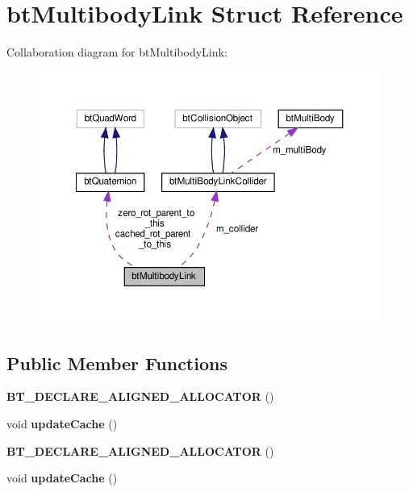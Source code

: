 \hypertarget{structbtMultibodyLink}{}\section{bt\+Multibody\+Link Struct Reference}
\label{structbtMultibodyLink}


Collaboration diagram for bt\+Multibody\+Link\+:
\nopagebreak
\begin{figure}[H]
\begin{center}
\leavevmode
\includegraphics[width=350pt]{structbtMultibodyLink__coll__graph}
\end{center}
\end{figure}
\subsection*{Public Member Functions}
\begin{DoxyCompactItemize}
\item 
\mbox{\label{structbtMultibodyLink_a7f9205c013f7aa0b98caa593c633f013}} 
{\bfseries B\+T\+\_\+\+D\+E\+C\+L\+A\+R\+E\+\_\+\+A\+L\+I\+G\+N\+E\+D\+\_\+\+A\+L\+L\+O\+C\+A\+T\+OR} ()
\item 
\mbox{\label{structbtMultibodyLink_a2fcde56a4b2c94a9f27ddb7d0fe08e0a}} 
void {\bfseries update\+Cache} ()
\item 
\mbox{\label{structbtMultibodyLink_a7f9205c013f7aa0b98caa593c633f013}} 
{\bfseries B\+T\+\_\+\+D\+E\+C\+L\+A\+R\+E\+\_\+\+A\+L\+I\+G\+N\+E\+D\+\_\+\+A\+L\+L\+O\+C\+A\+T\+OR} ()
\item 
\mbox{\label{structbtMultibodyLink_a2fcde56a4b2c94a9f27ddb7d0fe08e0a}} 
void {\bfseries update\+Cache} ()
\end{DoxyCompactItemize}
